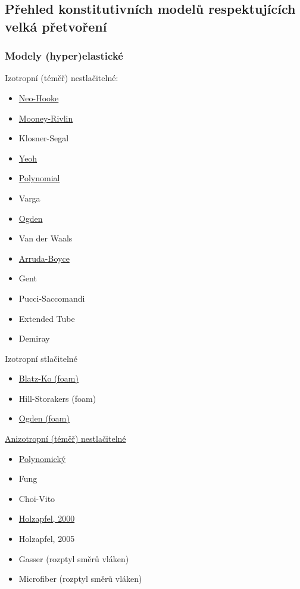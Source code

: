 \subsection{Přehled konstitutivních modelů respektujících velká přetvoření}
\subsubsection{Modely (hyper)elastické}
Izotropní (téměř) nestlačitelné: 
\begin{itemize}
	\item \hyperref[sec:neo-hooke]{Neo-Hooke}
	\item \hyperref[sec:mooney-rivlin]{Mooney-Rivlin}
	\item Klosner-Segal
	\item \hyperref[sec:yeoh]{Yeoh}
	\item \hyperref[sec:polynomicky-model]{Polynomial}
	\item Varga
	\item \hyperref[sec:model-ogden]{Ogden}
	\item Van der Waals
	\item \hyperref[sec:arruda-boyce]{Arruda-Boyce}
	\item Gent
	\item Pucci-Saccomandi
	\item Extended Tube
	\item Demiray
\end{itemize}

Izotropní stlačitelné
\begin{itemize}
	\item \hyperref[sec:blatz-ko]{Blatz-Ko (foam)}
	\item Hill-Storakers (foam)
	\item \hyperref[sec:ogden-foam]{Ogden (foam)}
\end{itemize}

\hyperref[sec:anizotropni-hyperelasticke-modely]{Anizotropní (téměř) nestlačitelné}
\begin{itemize}
	\item \hyperref[sec:polynomicky-anizotropni-hyperelasticky-model]{Polynomický}
	\item Fung
	\item Choi-Vito
	\item \hyperref[sec:model-hgo]{Holzapfel, 2000}
	\item Holzapfel, 2005
	\item Gasser (rozptyl směrů vláken)
	\item Microfiber (rozptyl směrů vláken)
\end{itemize}

